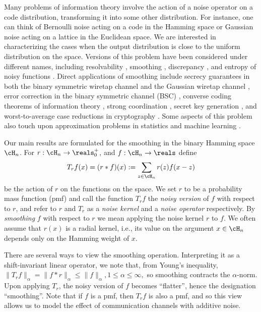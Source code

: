 \documentclass{amsart}
\theoremstyle{remark}
\begin{document}
Many problems of information theory involve the action of a noise operator on a code distribution, transforming it into some other distribution. For instance, one can think of Bernoulli noise acting on a code in the Hamming space or Gaussian noise acting on a lattice in the Euclidean space. We are interested in characterizing the cases when the output distribution is close to the uniform distribution on the space. Versions of this problem have been considered under different names, including resolvability \cite{han1993approximation,hayashi2006general,yu2018renyi}, smoothing \cite{debris2023smoothing,micciancio2007worst}, discrepancy \cite{Skriganov2001,Chen2002}, and entropy of noisy functions \cite{samorodnitsky2016entropy,samorodnitsky2019upper,samorodnitsky2020improved}. 
Direct applications of smoothing include secrecy guarantees in both the binary symmetric wiretap channel \cite{bloch2013strong,hayashi2006general,yu2018renyi} and the Gaussian wiretap channel \cite{belfiore2010secrecy,luzzi2023optimal}, error correction in the binary symmetric channel (BSC) \cite{hkazla2021codes,rao2022criterion}, converse coding theorems of information theory \cite{arimoto1973converse,han1993approximation,polyanskiy2010arimoto,polyanskiy2013empirical}, strong coordination \cite{cover2007capacity,CuffPermuterCover2010, bloch2013strong, Cuff2013, ChouBlochKliewer2018}, secret key generation \cite{chou2015polar, luzzi2023optimal}, and worst-to-average case reductions in cryptography \cite{micciancio2007worst,brakerski2019worst}. Some aspects of this problem also touch upon approximation problems in statistics and machine learning \cite{nietert2021smooth,goldfeld2022limit,goldfeld2022statistical}.


Our main results are formulated for the smoothing in the binary Hamming space $\cH_n$. For  $r:\cH_n\to \reals_0^+ $, and $f:\cH_n\to \reals $ define
  $$
     T_rf(x)=(r\ast f)(x):=\sum_{z\in \cH_n} r(z)f(x-z)
  $$
be the action of $r$ on the functions on the space. We set $r$ to be a probability mass function (pmf) and call the function $T_rf$ the \emph{noisy version} of $f$ with respect to $r$, and refer to $r$ and $T_r$ as a \emph{noise kernel} and a \emph{noise operator} respectively. By \emph{smoothing} $f$ with respect to $r$ we mean applying the noise kernel $r$ to $f$. We often assume that $r(x)$ is a radial kernel, i.e., its value on the argument $x \in \cH_n$ depends only on the Hamming weight of $x$. 

There are several ways to view the smoothing operation. Interpreting it as a shift-invariant linear operator, we note that, from Young's inequality, $\|T_rf\|_\alpha =  \|f*r\|_{\alpha}  \leq \|f\|_{\alpha}, 1\le\alpha\le\infty,$ so smoothing contracts the $\alpha$-norm. Upon applying $T_r$, the noisy version of $f$ becomes ``flatter'', hence the designation ``smoothing''.
Note that if $f$ is a pmf, then $T_rf$ is also a pmf, and so this view allows us to model the effect of communication channels with additive noise.
\end{document}

